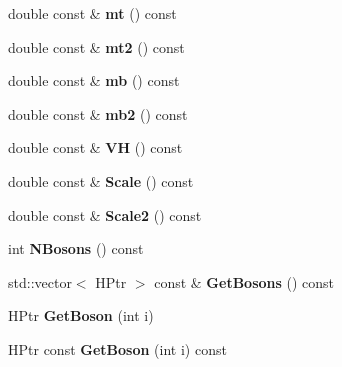 \begin{DoxyCompactItemize}
\item 
\hypertarget{classHiggsModel_a913923ce15ea38a8a1576ea9e5d23d10}{}double const \& {\bfseries mt} () const \label{classHiggsModel_a913923ce15ea38a8a1576ea9e5d23d10}

\item 
\hypertarget{classHiggsModel_ad0685a0848a95342b272147317948d10}{}double const \& {\bfseries mt2} () const \label{classHiggsModel_ad0685a0848a95342b272147317948d10}

\item 
\hypertarget{classHiggsModel_a8ec3f6255ab720fb08a94937d436cdea}{}double const \& {\bfseries mb} () const \label{classHiggsModel_a8ec3f6255ab720fb08a94937d436cdea}

\item 
\hypertarget{classHiggsModel_a33ea2c639935f9971bdca5e5994325ff}{}double const \& {\bfseries mb2} () const \label{classHiggsModel_a33ea2c639935f9971bdca5e5994325ff}

\item 
\hypertarget{classHiggsModel_a9711ab1e2b584f86d75f6e53b9a35822}{}double const \& {\bfseries V\+H} () const \label{classHiggsModel_a9711ab1e2b584f86d75f6e53b9a35822}

\item 
\hypertarget{classHiggsModel_af679483d403b1d8b2f291542215fa0bd}{}double const \& {\bfseries Scale} () const \label{classHiggsModel_af679483d403b1d8b2f291542215fa0bd}

\item 
\hypertarget{classHiggsModel_a2572b90895176763db5cbbb3233ec242}{}double const \& {\bfseries Scale2} () const \label{classHiggsModel_a2572b90895176763db5cbbb3233ec242}

\item 
\hypertarget{classHiggsModel_a08c33da1ef0b46ed04dd5f1f9f84ae9a}{}int {\bfseries N\+Bosons} () const \label{classHiggsModel_a08c33da1ef0b46ed04dd5f1f9f84ae9a}

\item 
\hypertarget{classHiggsModel_a56909ae8843fbd15bc54df272e1a245d}{}std\+::vector$<$ H\+Ptr $>$ const \& {\bfseries Get\+Bosons} () const \label{classHiggsModel_a56909ae8843fbd15bc54df272e1a245d}

\item 
\hypertarget{classHiggsModel_afa9a44f6a2bd358d887acd5771253953}{}H\+Ptr {\bfseries Get\+Boson} (int i)\label{classHiggsModel_afa9a44f6a2bd358d887acd5771253953}

\item 
\hypertarget{classHiggsModel_ae082694ec944cffd807f4f0a20bf931b}{}H\+Ptr const {\bfseries Get\+Boson} (int i) const \label{classHiggsModel_ae082694ec944cffd807f4f0a20bf931b}


\end{DoxyCompactItemize}

